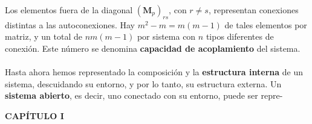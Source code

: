 {Los elementos fuera de la diagonal $(\mathbf{M}_p)_{rs}$, con $r \ne s$, representan conexiones distintas a las autoconexiones. Hay $m^2 - m = m(m - 1)$ de tales elementos por matriz, y un total de $nm(m - 1)$ por sistema con $n$ tipos diferentes de conexión. Este número se denomina \textbf{capacidad de acoplamiento} del sistema.
\\
\\
Hasta ahora hemos representado la composición y la \textbf{estructura interna} de un sistema, descuidando su entorno, y por lo tanto, su estructura externa. Un \textbf{sistema abierto}, es decir, uno conectado con su entorno, puede ser repre-
}

\newpage
\fancyhf{}
\fancyhead[l]{\thepage} 
\begin{center}
{\fontsize{13}{16}\selectfont \textbf{CAPÍTULO I}}
\end{center}
\vspace{0.5cm}


